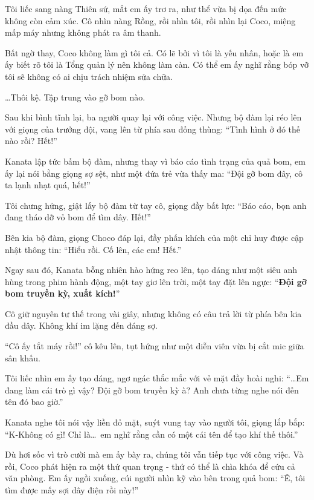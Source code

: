 \documentclass[../main.tex]{subfiles}
\begin{document}
Tôi liếc sang nàng Thiên sứ, mắt em ấy trơ ra, như thể vừa bị dọa đến mức không còn cảm xúc. Cô nhìn nàng Rồng, rồi nhìn tôi, rồi nhìn lại Coco, miệng mấp máy nhưng không phát ra âm thanh.

Bất ngờ thay, Coco không làm gì tôi cả. Có lẽ bởi vì tôi là yếu nhân, hoặc là em ấy biết rõ tôi là Tổng quản lý nên không làm càn. Có thể em ấy nghĩ rằng bóp vỡ tôi sẽ không có ai chịu trách nhiệm sửa chữa.

\dots Thôi kệ. Tập trung vào gỡ bom nào.

\ct

Sau khi bình tĩnh lại, ba người quay lại với công việc. Nhưng bộ đàm lại réo lên với giọng của trưởng đội, vang lên từ phía sau đống thùng: ``Tình hình ở đó thế nào rồi? Hết!''

Kanata lập tức bấm bộ đàm, nhưng thay vì báo cáo tình trạng của quả bom, em ấy lại nói bằng giọng sợ sệt, như một đứa trẻ vừa thấy ma: ``Đội gỡ bom đây, cô ta lạnh nhạt quá, hết!''

Tôi chưng hửng, giật lấy bộ đàm từ tay cô, giọng đầy bất lực: ``Báo cáo, bọn anh đang tháo dỡ vỏ bom để tìm dây. Hết!''

Bên kia bộ đàm, giọng Choco đáp lại, đầy phấn khích của một chỉ huy được cập nhật thông tin: ``Hiểu rồi. Cố lên, các em! Hết.''

Ngay sau đó, Kanata bỗng nhiên hào hứng reo lên, tạo dáng như một siêu anh hùng trong phim hành động, một tay giơ lên trời, một tay đặt lên ngực: ``\textbf{Đội gỡ bom truyền kỳ, xuất kích!}''


Cô giữ nguyên tư thế trong vài giây, nhưng không có câu trả lời từ phía bên kia đầu dây. Không khí im lặng đến đáng sợ.

``Cô ấy tắt máy rồi!''  cô kêu lên, tụt hứng như một diễn viên vừa bị cắt mic giữa sân khấu.

Tôi liếc nhìn em ấy tạo dáng, ngơ ngác thắc mắc với vẻ mặt đầy hoài nghi: ``\dots Em đang làm cái trò gì vậy? Đội gỡ bom truyền kỳ à? Anh chưa từng nghe nói đến tên đó bao giờ.''

Kanata nghe tôi nói vậy liền đỏ mặt, suýt vung tay vào người tôi, giọng lắp bắp: ``K-Không có gì! Chỉ là\dots\ em nghĩ rằng cần có một cái tên để tạo khí thế thôi.''

\ct

Dù hơi sốc vì trò cười mà em ấy bày ra, chúng tôi vẫn tiếp tục với công việc. Và rồi, Coco phát hiện ra một thứ quan trọng - thứ có thể là chìa khóa để cứu cả văn phòng. Em ấy ngồi xuống, cúi người nhìn kỹ vào bên trong quả bom: ``Ê, tôi tìm được mấy sợi dây điện rồi này!''
\end{document}
